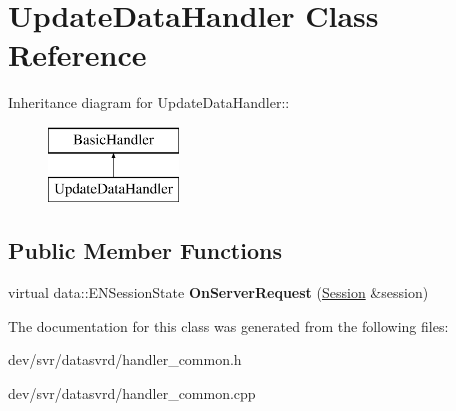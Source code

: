 \hypertarget{classUpdateDataHandler}{
\section{UpdateDataHandler Class Reference}
\label{classUpdateDataHandler}
}
Inheritance diagram for UpdateDataHandler::\begin{figure}[H]
\begin{center}
\leavevmode
\includegraphics[height=2cm]{classUpdateDataHandler}
\end{center}
\end{figure}
\subsection*{Public Member Functions}
\begin{DoxyCompactItemize}
\item 
\hypertarget{classUpdateDataHandler_a65a04485e9413d67d471e783f00c7da6}{
virtual data::ENSessionState {\bfseries OnServerRequest} (\hyperlink{classSession}{Session} \&session)}
\label{classUpdateDataHandler_a65a04485e9413d67d471e783f00c7da6}

\end{DoxyCompactItemize}


The documentation for this class was generated from the following files:\begin{DoxyCompactItemize}
\item 
dev/svr/datasvrd/handler\_\-common.h\item 
dev/svr/datasvrd/handler\_\-common.cpp\end{DoxyCompactItemize}
